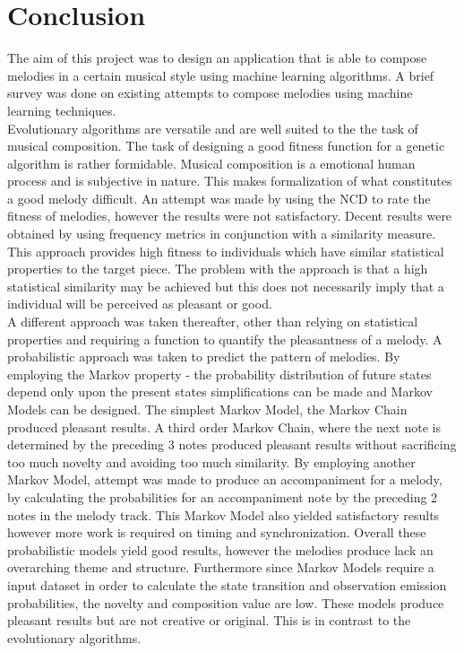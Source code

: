 \chapter{Conclusion}
The aim of this project was to design an application that is able to compose melodies in a certain musical style using machine learning algorithms. A brief survey was done on existing attempts to compose melodies using machine learning techniques.
\\

Evolutionary algorithms are versatile and are well suited to the the task of musical composition. The task of designing a good fitness function for a genetic algorithm is rather formidable.
Musical composition is a emotional human process and is subjective in nature. This makes formalization of what constitutes a good melody difficult. 
An attempt was made by using the \ac{NCD} to rate the fitness of melodies, however the results were not satisfactory.
Decent results were obtained by using frequency metrics in conjunction with a similarity measure. This approach provides high fitness to individuals which have similar statistical properties to the target piece. The problem with the approach is that a high statistical similarity may be achieved but this does not necessarily imply that a individual will be perceived as pleasant or good.
\\

A different approach was taken thereafter, other than relying on statistical properties and requiring a function to quantify the pleasantness of a melody. A probabilistic approach was taken to predict the pattern of melodies. By employing the Markov property - the probability distribution of future states depend only upon the present states simplifications can be made and Markov Models can be designed. The simplest Markov Model, the Markov Chain produced pleasant results. A third order Markov Chain, where the next note is determined by the preceding 3 notes produced pleasant results without sacrificing too much novelty and avoiding too much similarity. By employing another Markov Model, attempt was made to produce an accompaniment for a melody, by calculating the probabilities for an accompaniment note by the preceding 2 notes in the melody track. This Markov Model also yielded satisfactory results however more work is required on timing and synchronization.
Overall these probabilistic models yield good results, however the melodies produce lack an overarching theme and structure. Furthermore since Markov Models require a input dataset in order to calculate the state transition and observation emission probabilities, the novelty and composition value are low. These models produce pleasant results but are not creative or original. This is in contrast to the evolutionary algorithms.
\\

